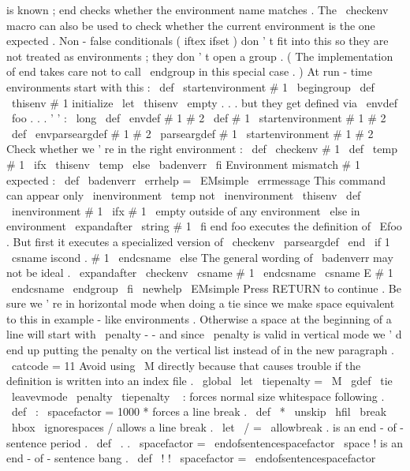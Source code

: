 {is
known
;
end
checks
%
whether
the
environment
name
matches
.
The
\
checkenv
macro
can
also
be
%
used
to
check
whether
the
current
environment
is
the
one
expected
.
%
%
Non
-
false
conditionals
(
iftex
ifset
)
don
'
t
fit
into
this
so
they
%
are
not
treated
as
environments
;
they
don
'
t
open
a
group
.
(
The
%
implementation
of
end
takes
care
not
to
call
\
endgroup
in
this
%
special
case
.
)
%
At
run
-
time
environments
start
with
this
:
\
def
\
startenvironment
#
1
{
\
begingroup
\
def
\
thisenv
{
#
1
}
}
%
initialize
\
let
\
thisenv
\
empty
%
.
.
.
but
they
get
defined
via
\
envdef
\
foo
{
.
.
.
}
'
'
:
\
long
\
def
\
envdef
#
1
#
2
{
\
def
#
1
{
\
startenvironment
#
1
#
2
}
}
\
def
\
envparseargdef
#
1
#
2
{
\
parseargdef
#
1
{
\
startenvironment
#
1
#
2
}
}
%
Check
whether
we
'
re
in
the
right
environment
:
\
def
\
checkenv
#
1
{
%
\
def
\
temp
{
#
1
}
%
\
ifx
\
thisenv
\
temp
\
else
\
badenverr
\
fi
}
%
Environment
mismatch
#
1
expected
:
\
def
\
badenverr
{
%
\
errhelp
=
\
EMsimple
\
errmessage
{
This
command
can
appear
only
\
inenvironment
\
temp
not
\
inenvironment
\
thisenv
}
%
}
\
def
\
inenvironment
#
1
{
%
\
ifx
#
1
\
empty
outside
of
any
environment
%
\
else
in
environment
\
expandafter
\
string
#
1
%
\
fi
}
%
end
foo
executes
the
definition
of
\
Efoo
.
%
But
first
it
executes
a
specialized
version
of
\
checkenv
%
\
parseargdef
\
end
{
%
\
if
1
\
csname
iscond
.
#
1
\
endcsname
\
else
%
The
general
wording
of
\
badenverr
may
not
be
ideal
.
\
expandafter
\
checkenv
\
csname
#
1
\
endcsname
\
csname
E
#
1
\
endcsname
\
endgroup
\
fi
}
\
newhelp
\
EMsimple
{
Press
RETURN
to
continue
.
}
%
Be
sure
we
'
re
in
horizontal
mode
when
doing
a
tie
since
we
make
space
%
equivalent
to
this
in
example
-
like
environments
.
Otherwise
a
space
%
at
the
beginning
of
a
line
will
start
with
\
penalty
-
-
and
%
since
\
penalty
is
valid
in
vertical
mode
we
'
d
end
up
putting
the
%
penalty
on
the
vertical
list
instead
of
in
the
new
paragraph
.
{
\
catcode
=
11
%
Avoid
using
\
M
directly
because
that
causes
trouble
%
if
the
definition
is
written
into
an
index
file
.
\
global
\
let
\
tiepenalty
=
\
M
\
gdef
\
tie
{
\
leavevmode
\
penalty
\
tiepenalty
\
}
}
%
:
forces
normal
size
whitespace
following
.
\
def
\
:
{
\
spacefactor
=
1000
}
%
*
forces
a
line
break
.
\
def
\
*
{
\
unskip
\
hfil
\
break
\
hbox
{
}
\
ignorespaces
}
%
/
allows
a
line
break
.
\
let
\
/
=
\
allowbreak
%
.
is
an
end
-
of
-
sentence
period
.
\
def
\
.
{
.
\
spacefactor
=
\
endofsentencespacefactor
\
space
}
%
!
is
an
end
-
of
-
sentence
bang
.
\
def
\
!
{
!
\
spacefactor
=
\
endofsentencespacefactor
}}
